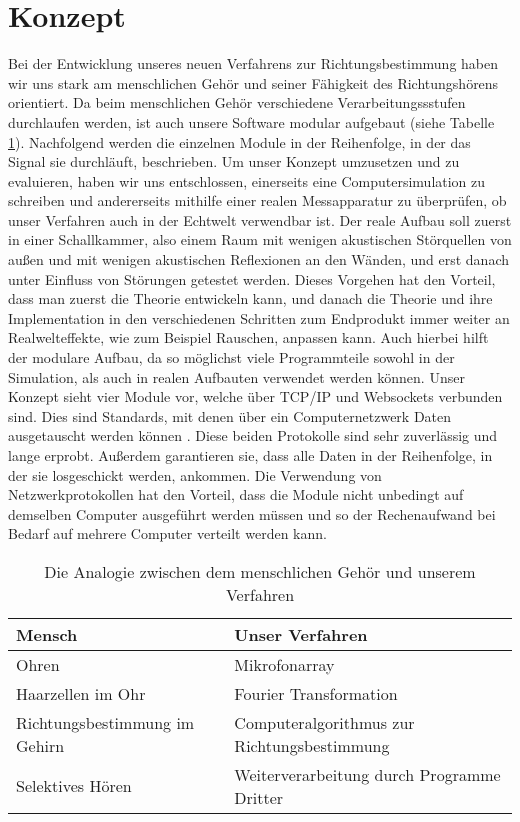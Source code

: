 \section{Konzept}
Bei der Entwicklung unseres neuen Verfahrens zur Richtungsbestimmung haben wir uns stark am menschlichen Gehör und seiner Fähigkeit des Richtungshörens orientiert. Da beim menschlichen Gehör verschiedene Verarbeitungssstufen durchlaufen werden, ist auch unsere Software modular aufgebaut (siehe Tabelle \ref{analog}). Nachfolgend werden die einzelnen Module in der Reihenfolge, in der das Signal sie durchläuft, beschrieben.
Um unser Konzept umzusetzen und zu evaluieren, haben wir uns entschlossen, einerseits eine Computersimulation zu schreiben und andererseits mithilfe einer realen Messapparatur zu überprüfen, ob unser Verfahren auch in der Echtwelt verwendbar ist. Der reale Aufbau soll zuerst in einer Schallkammer, also einem Raum mit wenigen akustischen Störquellen von außen und mit wenigen akustischen Reflexionen an den Wänden, und erst danach unter Einfluss von Störungen getestet werden. Dieses Vorgehen hat den Vorteil, dass man zuerst die Theorie entwickeln kann, und danach die Theorie und ihre Implementation in den verschiedenen Schritten zum Endprodukt immer weiter an Realwelteffekte, wie zum Beispiel Rauschen, anpassen kann. Auch hierbei hilft der modulare Aufbau, da so möglichst viele Programmteile sowohl in der Simulation, als auch in realen Aufbauten verwendet werden können.
Unser Konzept sieht vier Module vor, welche über TCP/IP und Websockets verbunden sind. Dies sind Standards, mit denen über ein Computernetzwerk Daten ausgetauscht werden können \cite{tcp} \cite{websockets}. Diese beiden Protokolle sind sehr zuverlässig und lange erprobt. Außerdem garantieren sie, dass alle Daten in der Reihenfolge, in der sie losgeschickt werden, ankommen. Die Verwendung von Netzwerkprotokollen hat den Vorteil, dass die Module nicht unbedingt auf demselben Computer ausgeführt werden müssen und so der Rechenaufwand bei Bedarf auf mehrere Computer verteilt werden kann.
\begin{table}[h]
	\centering
	\begin{tabular}{ll}
		Mensch            & Unser Verfahren                                   \\ \hline
		Ohren             & Mikrofonarray                              \\
		Haarzellen im Ohr & Fourier Transformation                     \\
		Richtungsbestimmung im Gehirn            & Computeralgorithmus zur Richtungsbestimmung                       \\
		Selektives Hören  & Weiterverarbeitung durch Programme Dritter
	\end{tabular}
	\caption{Die Analogie zwischen dem menschlichen Gehör und unserem Verfahren}
	\label{analog}
\end{table}

